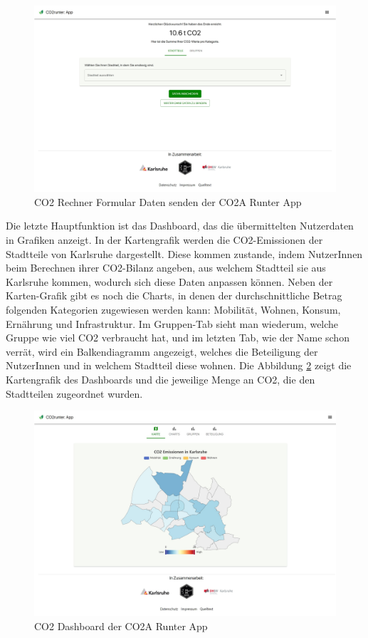 \begin{figure}[h]
    \centering
    \includegraphics[width=1\textwidth]{images/02/CO2-Runter-App-Daten-Senden.jpeg}
    \caption{CO2 Rechner Formular Daten senden der CO2A Runter App}
    \label{fig:co2runterapp-send}
\end{figure}

Die letzte Hauptfunktion ist das Dashboard, das die übermittelten Nutzerdaten in Grafiken anzeigt. In der Kartengrafik werden die CO2-Emissionen der Stadtteile von Karlsruhe dargestellt. Diese kommen zustande, indem NutzerInnen beim Berechnen ihrer CO2-Bilanz angeben, aus welchem Stadtteil sie aus Karlsruhe kommen, wodurch sich diese Daten anpassen können. Neben der Karten-Grafik gibt es noch die Charts, in denen der durchschnittliche Betrag folgenden Kategorien zugewiesen werden kann: Mobilität, Wohnen, Konsum, Ernährung und Infrastruktur. Im Gruppen-Tab sieht man wiederum, welche Gruppe wie viel CO2 verbraucht hat, und im letzten Tab, wie der Name schon verrät, wird ein Balkendiagramm angezeigt, welches die Beteiligung der NutzerInnen und in welchem Stadtteil diese wohnen. Die Abbildung \ref{fig:co2runterapp-dashboard} zeigt die Kartengrafik des Dashboards und die jeweilige Menge an CO2, die den Stadtteilen zugeordnet wurden.

\newpage

\begin{figure}[h]
    \centering
    \includegraphics[width=1\textwidth]{images/02/CO2-Runter-App-Dashboard.jpeg}
    \caption{CO2 Dashboard der CO2A Runter App}
    \label{fig:co2runterapp-dashboard}
\end{figure}

